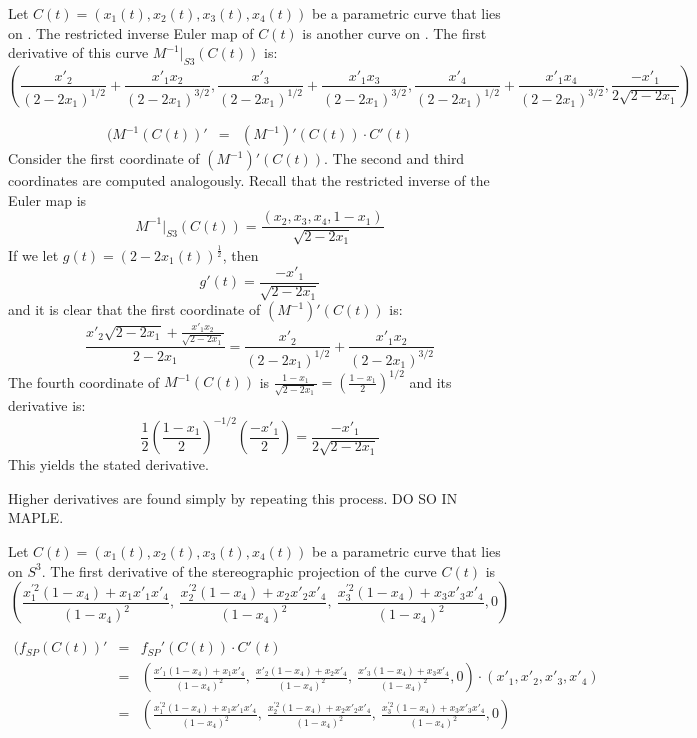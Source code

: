 \documentclass[11pt]{article}
\begin{document}
\begin{lemma}
Let $C(t) = (x_1(t),x_2(t),x_3(t),x_4(t))$ be a parametric curve that lies on .
The restricted inverse Euler map of $C(t)$ is another curve on .
The first derivative of this curve $M^{-1}|_{S3}(C(t))$ is:
\[
(\frac{x'_2}{(2-2x_1)^{1/2}} + \frac{x'_1x_2}{(2-2x_1)^{3/2}}, 
 \frac{x'_3}{(2-2x_1)^{1/2}} + \frac{x'_1x_3}{(2-2x_1)^{3/2}},
 \frac{x'_4}{(2-2x_1)^{1/2}} + \frac{x'_1x_4}{(2-2x_1)^{3/2}},
 \frac{-x'_1}{2\sqrt{2-2x_1}})
\]
\end{lemma}
\prf
\begin{eqnarray*}
(M^{-1}(C(t))' & = & (M^{-1})'(C(t)) \cdot C'(t)
\end{eqnarray*}
Consider the first coordinate of $(M^{-1})'(C(t))$.
The second and third coordinates are computed analogously.
Recall that the restricted inverse of the Euler map is
\[
M^{-1}|_{S3}(C(t)) = \frac{(x_2,x_3,x_4,1-x_1)}{\sqrt{2-2x_1}}
\]
If we let $g(t) = (2-2x_1(t))^{\frac{1}{2}}$, then
\[
g'(t) = \frac{-x'_1}{\sqrt{2-2x_1}}
\]
and it is clear that the first coordinate of $(M^{-1})'(C(t))$ is:
\[
\frac{x'_2 \sqrt{2-2x_1} + \frac{x'_1 x_2}{\sqrt{2-2x_1}}}{2-2x_1}
= \frac{x'_2}{(2-2x_1)^{1/2}} + \frac{x'_1x_2}{(2-2x_1)^{3/2}}
\]
The fourth coordinate of $M^{-1}(C(t))$ is 
$\frac{1-x_1}{\sqrt{2-2x_1}} = (\frac{1-x_1}{2})^{1/2}$
and its derivative is:
\[
\frac{1}{2} (\frac{1-x_1}{2})^{-1/2}(\frac{-x'_1}{2})
= \frac{-x'_1}{2\sqrt{2-2x_1}}
\]
This yields the stated derivative.
\QED

Higher derivatives are found simply by repeating this process. 
DO SO IN MAPLE.

\begin{lemma}
Let $C(t) = (x_1(t),x_2(t),x_3(t),x_4(t))$ be a parametric curve that lies on $S^3$.
The first derivative of the stereographic projection of the curve $C(t)$ is 
\[
(\frac{x^{'2}_1(1-x_4) + x_1x'_1x'_4}{(1-x_4)^2},\ 
                \frac{x^{'2}_2(1-x_4) + x_2x'_2x'_4}{(1-x_4)^2},\  
                  \frac{x^{'2}_3(1-x_4) + x_3x'_3x'_4}{(1-x_4)^2}, 0)
\]
\end{lemma}
\prf
\begin{eqnarray*}
(f_{SP}(C(t))' & = & f_{SP}'(C(t)) \cdot C'(t) \\
           & = & (\frac{x'_1(1-x_4) + x_1x'_4}{(1-x_4)^2},\ 
                  \frac{x'_2(1-x_4) + x_2x'_4}{(1-x_4)^2},\  
                  \frac{x'_3(1-x_4) + x_3x'_4}{(1-x_4)^2}, 0) 
		  \cdot (x'_1, x'_2, x'_3, x'_4) \\
           & = & (\frac{x^{'2}_1(1-x_4) + x_1x'_1x'_4}{(1-x_4)^2},\ 
                  \frac{x^{'2}_2(1-x_4) + x_2x'_2x'_4}{(1-x_4)^2},\  
                  \frac{x^{'2}_3(1-x_4) + x_3x'_3x'_4}{(1-x_4)^2}, 0)
\end{eqnarray*}
\QED
\end{document}
